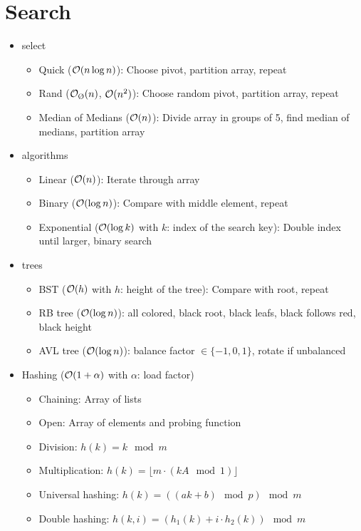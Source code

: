 \documentclass{article}
\begin{document}
\section{Search}
\begin{itemize}
  \item select \begin{itemize}
          \item Quick ($\mathcal{O}(n\log n)$): Choose pivot, partition array, repeat
          \item Rand ($\bigO_\text{\O}(n)$, $\mathcal{O}(n^2)$): Choose random pivot, partition array, repeat
          \item Median of Medians ($\mathcal{O}(n)$): Divide array in groups of 5, find median of medians, partition array
        \end{itemize}
  \item algorithms \begin{itemize}
          \item Linear ($\mathcal{O}(n)$): Iterate through array
          \item Binary ($\mathcal{O}(\log n)$): Compare with middle element, repeat
          \item Exponential ($\mathcal{O}(\log k)$ with $k$: index of the search key): Double index until larger, binary search
        \end{itemize}
  \item trees \begin{itemize}
          \item BST ($\mathcal{O}(h)$ with $h$: height of the tree): Compare with root, repeat
          \item RB tree ($\mathcal{O}(\log n)$): all colored, black root, black leafs, black follows red, black height
          \item AVL tree ($\mathcal{O}(\log n)$): balance factor $\in \{-1,0,1\}$, rotate if unbalanced
        \end{itemize}
  \item Hashing ($\mathcal{O}(1+\alpha)$ with $\alpha$: load factor) \begin{itemize}
          \item Chaining: Array of lists
          \item Open: Array of elements and probing function
          \item Division: $h(k) = k \mod m$
          \item Multiplication: $h(k) = \lfloor m \cdot (kA \mod 1) \rfloor$
          \item Universal hashing: $h(k) = ((ak+b) \mod p) \mod m$
          \item Double hashing: $h(k,i) = (h_1(k) + i \cdot h_2(k)) \mod m$
        \end{itemize}
\end{itemize}
\end{document}
